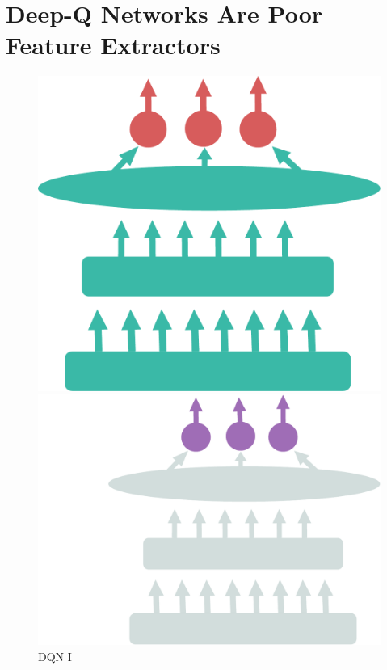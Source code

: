 


\section{Deep-Q Networks Are Poor Feature Extractors}

\begin{figure}[ht]
\centering
\begin{minipage}[b]{0.32\linewidth}
\centering
\includegraphics[width=\textwidth]{./Images/Chapter08/pre_trained_network.pdf}
\caption{DQN I}
\label{fig:net1}
\end{minipage}
\hspace{0.5cm}
\begin{minipage}[b]{0.4\linewidth}
\centering
\includegraphics[width=\textwidth]{./Images/Chapter08/only_head.pdf}

\end{minipage}
\end{figure}

